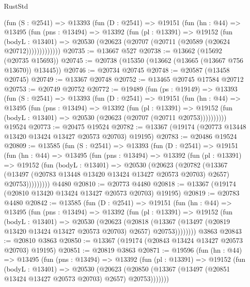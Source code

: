 \begin{lexlean}{RustStd}
\begin{coremodule}
        (fun (S : @2541) =>
        @13393
          (fun (D : @2541) =>
          @19151
            (fun (hn : @44) =>
            @13495
              (fun (pns : @13494) =>
              @13392
                (fun (pl : @13391) =>
                @19152
                  (fun (bodyL : @13401) =>
                  @20530 (@20623 (@20707 (@20711 (@20589 (@20624 @20712)))))))))))))
@20735 := @13667 @527
@20738 := @13662 (@15692 (@20735 @15693))
@20745 := @20738 (@15350 (@13662 (@13665 (@13667 @756 @13670)) @13445))
@20746 := @20734 @20745
@20748 := @20587 (@13458 @20745)
@20749 := @13367 @20748
@20752 := @13465 @20745 @17584 @20712
@20753 := @20749 @20752
@20772 := @19489
    (fun (ps : @19149) =>
    @13393
      (fun (S : @2541) =>
      @13393
        (fun (D : @2541) =>
        @19151
          (fun (hn : @44) =>
          @13495
            (fun (pns : @13494) =>
            @13392
              (fun (pl : @13391) =>
              @19152 (fun (bodyL : @13401) => @20530 (@20623 (@20707 (@20711 @20753))))))))))
    @19524
@20773 := @20475 @19524
@20782 := @13367 (@19174 (@20773 @13448 @13420 @13424 @13427 @20573 @20703) @19195)
@20783 := @20486 @19524
@20809 := @13585
    (fun (S : @2541) =>
    @13393
      (fun (D : @2541) =>
      @19151
        (fun (hn : @44) =>
        @13495
          (fun (pns : @13494) =>
          @13392
            (fun (pl : @13391) =>
            @19152
              (fun (bodyL : @13401) =>
              @20530
                (@20623
                  (@20782
                    (@13367
                      (@13497 (@20783 @13448 @13420 @13424 @13427 @20573 @20703) @2657)
                      @20753)))))))))
    @4480
@20810 := @20773 @4480
@20818 := @13367 (@19174 (@20810 @13420 @13424 @13427 @20573 @20703) @19195)
@20819 := @20783 @4480
@20842 := @13585
    (fun (D : @2541) =>
    @19151
      (fun (hn : @44) =>
      @13495
        (fun (pns : @13494) =>
        @13392
          (fun (pl : @13391) =>
          @19152
            (fun (bodyL : @13401) =>
            @20530
              (@20623
                (@20818
                  (@13367 (@13497 (@20819 @13420 @13424 @13427 @20573 @20703) @2657) @20753))))))))
    @3863
@20843 := @20810 @3863
@20850 := @13367 (@19174 (@20843 @13424 @13427 @20573 @20703) @19195)
@20851 := @20819 @3863
@20871 := @19596
    (fun (hn : @44) =>
    @13495
      (fun (pns : @13494) =>
      @13392
        (fun (pl : @13391) =>
        @19152
          (fun (bodyL : @13401) =>
          @20530
            (@20623
              (@20850 (@13367 (@13497 (@20851 @13424 @13427 @20573 @20703) @2657) @20753)))))))

\end{coremodule}
\end{lexlean}
